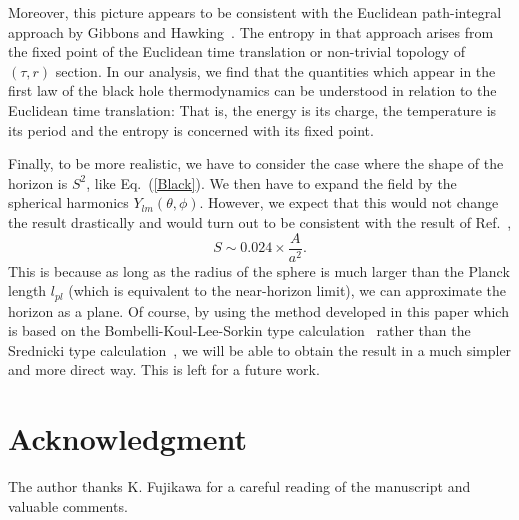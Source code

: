 \documentclass[12pt,epsf]{article}
\begin{document}
Moreover, this picture appears to be consistent with the Euclidean
path-integral approach by Gibbons and
Hawking~\cite{GibHaw77,Hawkin79,HawHun99}.
The entropy in that approach arises from the fixed point
of the Euclidean time translation or non-trivial topology
of $(\tau,r)$ section.
In our analysis, we find that the quantities
which appear in the first law
of the black hole thermodynamics
can be understood in relation to
the Euclidean time translation:
That is, the energy is its charge,
the temperature is its period and
the entropy is concerned with its fixed point.

Finally, 
to be more realistic,
we have to consider the case where the shape of
the horizon is $S^2$, like Eq.~(\ref{Black}).
We then have to expand the field by the spherical harmonics
$Y_{lm}(\theta,\phi)$.
However, we expect that this would not change the result
drastically and would turn out to be
 consistent with the result of Ref.~\cite{MuSeKo98},
\begin{equation}
  S \sim 0.024 \times \frac{A}{a^2}.
\end{equation}
This is because as long as the radius of the sphere is much larger
than the Planck length $l_{pl}$
(which is equivalent to the near-horizon limit),
we can approximate the horizon as a plane.
Of course,
by using the method developed in this paper
which is based on the Bombelli-Koul-Lee-Sorkin
type calculation~\cite{BKLS86}
rather than the Srednicki type calculation~\cite{Sredni93},
we will be able to obtain the result in a much simpler
and more direct way.
This is left for a future work.

\section*{Acknowledgment}
The author thanks K. Fujikawa for a careful reading of
the manuscript and valuable comments.
\end{document}
